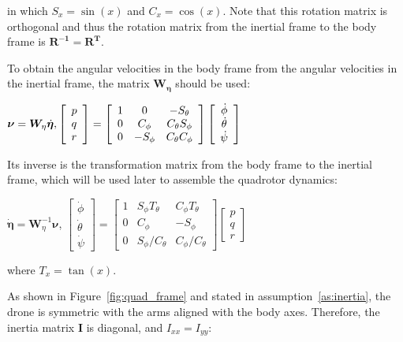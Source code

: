 \documentclass[letterpaper, 10 pt, conference]{ieeeconf}  %
\begin{document}
in which $S_{x}=\sin (x)$ and $C_{x}=\cos (x)$. Note that this rotation matrix is orthogonal and thus the rotation matrix from the inertial frame to the body frame is $\bm{R^{-1} = \bm{R^T}}$.

To obtain the angular velocities in the body frame from the angular velocities in the inertial frame, the matrix $\bm{W_\eta}$ should be used:

$\bm{\nu}=\bm{W}_{\eta} \dot{\bm{\eta}}, \hfill \left[ \begin{array}{l}{p} \\ {q} \\ {r}\end{array}\right]=\left[ \begin{array}{ccc}{1} & {0} & {-S_{\theta}} \\ {0} & {C_{\phi}} & {C_{\theta} S_{\phi}} \\ {0} & {-S_{\phi}} & {C_{\theta} C_{\phi}}\end{array}\right] \left[ \begin{array}{c}{\dot{\phi}} \\ {\dot{\theta}} \\ {\dot{\psi}}\end{array}\right]$

Its inverse is the transformation matrix from the body frame to the inertial frame, which will be used later to assemble the quadrotor dynamics:

$\dot{\bm{\eta}}=\bm{W}_{\eta}^{-1} \bm{\nu}$, \hfill $\left[ \begin{array}{c}{\dot{\phi}} \\ {\dot{\theta}} \\ {\dot{\psi}}\end{array}\right]=\left[ \begin{array}{ccc}{1} & {S_{\phi} T_{\theta}} & {C_{\phi} T_{\theta}} \\ {0} & {C_{\phi}} & {-S_{\phi}} \\ {0} & {S_{\phi} / C_{\theta}} & {C_{\phi} / C_{\theta}}\end{array}\right] \left[ \begin{array}{l}{p} \\ {q} \\ {r}\end{array}\right]$

where $T_{x}=\tan (x)$.

As shown in Figure~\ref{fig:quad_frame} and stated in assumption~\ref{as:inertia}, the drone is symmetric with the arms aligned with the body axes. Therefore, the inertia matrix $\textbf{I}$ is diagonal, and $I_{xx} = I_{yy}$:
\end{document}
